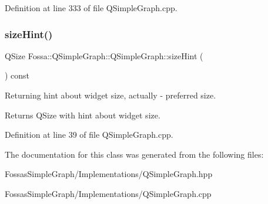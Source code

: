 Definition at line 333 of file Q\+Simple\+Graph.\+cpp.

\mbox{\label{class_fossa_1_1_q_simple_graph_1_1_q_simple_graph_a7cc7465f2137a1d9f80425afec47faeb}} 
\subsubsection{\texorpdfstring{size\+Hint()}{sizeHint()}}
{\footnotesize\ttfamily Q\+Size Fossa\+::\+Q\+Simple\+Graph\+::\+Q\+Simple\+Graph\+::size\+Hint (\begin{DoxyParamCaption}{ }\end{DoxyParamCaption}) const}



Returning hint about widget size, actually -\/ preferred size. 

\begin{DoxyReturn}{Returns}
Q\+Size with hint about widget size. 
\end{DoxyReturn}


Definition at line 39 of file Q\+Simple\+Graph.\+cpp.



The documentation for this class was generated from the following files\+:\begin{DoxyCompactItemize}
\item 
Fossas\+Simple\+Graph/\+Implementations/Q\+Simple\+Graph.\+hpp\item 
Fossas\+Simple\+Graph/\+Implementations/Q\+Simple\+Graph.\+cpp\end{DoxyCompactItemize}
